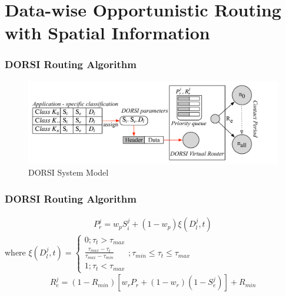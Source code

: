 \documentclass{beamer}
\begin{document}
\section{Data-wise Opportunistic Routing with Spatial Information}
\begin{frame}
	\frametitle{DORSI Routing Algorithm}
	\begin{figure}
\centering
\includegraphics[width=0.7\linewidth]{Figures_Present/Fig2}
\caption{DORSI System Model}
\label{fig:Fig2}
\end{figure}
\end{frame}
\begin{frame}
	\frametitle{DORSI Routing Algorithm}
\begin{eqnarray}
{ P }_{ r }^{ j }={ w }_{ p }{ S }_{ i }^{ j }+(1-{ w }_{ p })\xi ({ D }_{ l }^{ j },t)
\end{eqnarray}
where
$ \xi ({ D }_{ l }^{ j },t)=\begin{cases} 0;{ \tau  }_{ t }>{ \tau  }_{ max } \\ \frac { { \tau  }_{ max }-{ \tau  }_{ t } }{ { \tau  }_{ max }-{ \tau  }_{ min } }  \\ 1;{ \tau  }_{ t }<{ \tau  }_{ max } \end{cases};{ \tau  }_{ min }\le { \tau  }_{ t }\le { \tau  }_{ max } $
\begin{eqnarray}
{ R }_{ e }^{ j }=(1-{ R }_{ min })[{ w }_{ r }{ P }_{ r }+(1-{ w }_{ r })(1-{ S }_{ e }^{ j })]+{ R }_{ min }
\end{eqnarray}
\end{frame}
\end{document}
